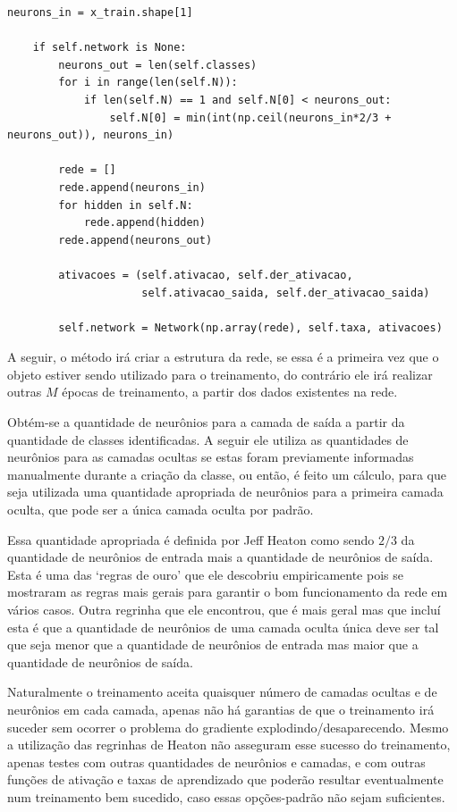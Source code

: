 \begin{scriptsize}
\estiloR
\begin{lstlisting}[caption={Trecho da classe \eng{Perceptron}}, label={lst:percep_3}, escapeinside={\%}]
	neurons_in = x_train.shape[1]

	if self.network is None:
	    neurons_out = len(self.classes)
	    for i in range(len(self.N)):
	        if len(self.N) == 1 and self.N[0] < neurons_out:
	            self.N[0] = min(int(np.ceil(neurons_in*2/3 + neurons_out)), neurons_in)
	    
	    rede = []
	    rede.append(neurons_in)
	    for hidden in self.N:
	        rede.append(hidden)
	    rede.append(neurons_out)
	    
	    ativacoes = (self.ativacao, self.der_ativacao, 
	                 self.ativacao_saida, self.der_ativacao_saida)

	    self.network = Network(np.array(rede), self.taxa, ativacoes)
\end{lstlisting}
\end{scriptsize}

A seguir, o método irá criar a estrutura da rede, se essa é a primeira vez que o objeto estiver sendo utilizado para o treinamento, do contrário ele irá realizar outras $M$ épocas de treinamento, a partir dos dados existentes na rede. 

Obtém-se a quantidade de neurônios para a camada de saída a partir da quantidade de classes identificadas. A seguir ele utiliza as quantidades de neurônios para as camadas ocultas se estas foram previamente informadas manualmente durante a criação da classe, ou então, é feito um cálculo, para que seja utilizada uma quantidade apropriada de neurônios para a primeira camada oculta, que pode ser a única camada oculta por padrão.

Essa quantidade apropriada é definida por Jeff Heaton \citep{layers_2} como sendo $2/3$ da quantidade de neurônios de entrada mais a quantidade de neurônios de saída. Esta é uma das `regras de ouro' que ele descobriu empiricamente pois se mostraram as regras mais gerais para garantir o bom funcionamento da rede em vários casos. Outra regrinha que ele encontrou, que é mais geral mas que incluí esta é que a quantidade de neurônios de uma camada oculta única deve ser tal que seja menor que a quantidade de neurônios de entrada mas maior que a quantidade de neurônios de saída.

Naturalmente o treinamento aceita quaisquer número de camadas ocultas e de neurônios em cada camada, apenas não há garantias de que o treinamento irá suceder sem ocorrer o problema do gradiente explodindo/desaparecendo. Mesmo a utilização das regrinhas de Heaton \citep{layers_2} não asseguram esse sucesso do treinamento, apenas testes com outras quantidades de neurônios e camadas, e com outras funções de ativação e taxas de aprendizado que poderão resultar eventualmente num treinamento bem sucedido, caso essas opções-padrão não sejam suficientes.

